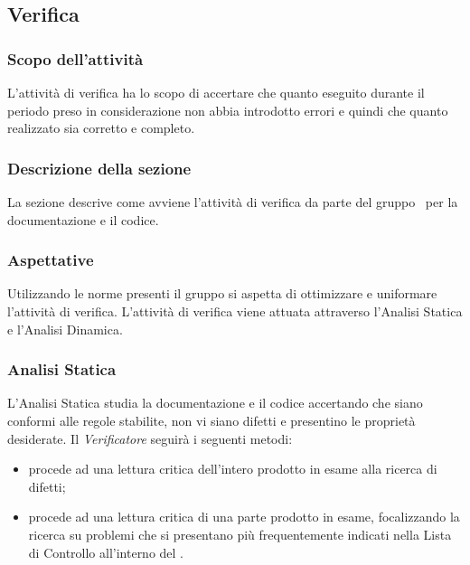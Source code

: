 \subsection{Verifica}\label{Verifica}
\subsubsection{Scopo dell'attività} \label{PSup_Verifica_Scopo}
L'attività di verifica ha lo scopo di accertare che quanto eseguito durante il periodo preso in considerazione non abbia introdotto errori e quindi che quanto realizzato sia corretto e completo.

\subsubsection{Descrizione della sezione} 
La sezione descrive come avviene l'attività di verifica da parte del gruppo \Gruppo\ per la documentazione e il codice.

\subsubsection{Aspettative}
Utilizzando le norme presenti il gruppo si aspetta di ottimizzare e uniformare l'attività di verifica. L'attività di verifica viene attuata attraverso l'Analisi Statica e l'Analisi Dinamica.

\subsubsection{Analisi Statica}
L'Analisi Statica studia la documentazione e il codice accertando che siano conformi alle regole stabilite, non vi siano difetti e presentino le proprietà desiderate.
Il \textit{Verificatore} seguirà i seguenti metodi:
\begin{itemize}
	\item {} procede ad una lettura critica dell'intero prodotto in esame alla ricerca di difetti;
	\item {} procede ad una lettura critica di una parte prodotto in esame, focalizzando la ricerca su problemi che si presentano più frequentemente indicati nella Lista di Controllo all'interno del \PdQv{}.
\end{itemize}

